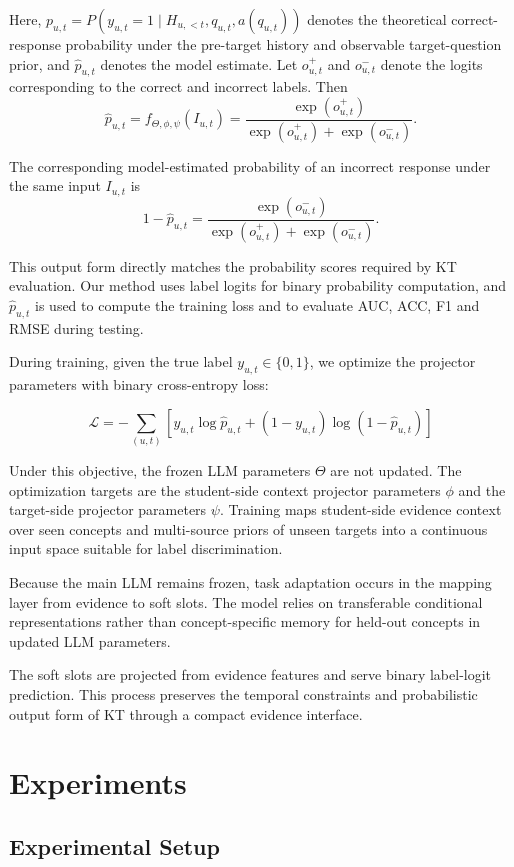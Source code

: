 \documentclass[a4paper,12pt]{article}
\numberwithin{table}{section}
\begin{document}
Here, \(p_{u,t}=P(y_{u,t}=1\mid H_{u,<t},q_{u,t},a(q_{u,t}))\) denotes the theoretical correct-response probability under the pre-target history and observable target-question prior, and \(\hat p_{u,t}\) denotes the model estimate. Let \(o^{+}_{u,t}\) and \(o^{-}_{u,t}\) denote the logits corresponding to the correct and incorrect labels. Then
\[
\hat p_{u,t}=f_{\Theta,\phi,\psi}(I_{u,t})=\frac{\exp(o^{+}_{u,t})}{\exp(o^{+}_{u,t})+\exp(o^{-}_{u,t})}.
\]

The corresponding model-estimated probability of an incorrect response under the same input \(I_{u,t}\) is
\[
1-\hat p_{u,t}=\frac{\exp(o^{-}_{u,t})}{\exp(o^{+}_{u,t}) + \exp(o^{-}_{u,t})}.
\]

This output form directly matches the probability scores required by KT evaluation. Our method uses label logits for binary probability computation, and \(\hat{p}_{u,t}\) is used to compute the training loss and to evaluate AUC, ACC, F1 and RMSE during testing.

During training, given the true label \(y_{u,t} \in \{0,1\}\), we optimize the projector parameters with binary cross-entropy loss:

\[
\mathcal{L} = -\sum_{(u,t)} \left[
    y_{u,t} \log \hat{p}_{u,t}
    + (1-y_{u,t}) \log(1-\hat{p}_{u,t})
\right]
\]

Under this objective, the frozen LLM parameters \(\Theta\) are not updated. The optimization targets are the student-side context projector parameters \(\phi\) and the target-side projector parameters \(\psi\). Training maps student-side evidence context over seen concepts and multi-source priors of unseen targets into a continuous input space suitable for label discrimination.

Because the main LLM remains frozen, task adaptation occurs in the mapping layer from evidence to soft slots. The model relies on transferable conditional representations rather than concept-specific memory for held-out concepts in updated LLM parameters.

The soft slots are projected from evidence features and serve binary label-logit prediction\citep{lester2021power,li2021prefixtuning}. This process preserves the temporal constraints and probabilistic output form of KT through a compact evidence interface.

\section{Experiments}
\subsection{Experimental Setup}
\end{document}
